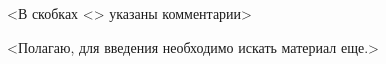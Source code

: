 
<В скобках <> указаны комментарии>

<Полагаю, для введения необходимо искать материал еще.>

\clearpage
